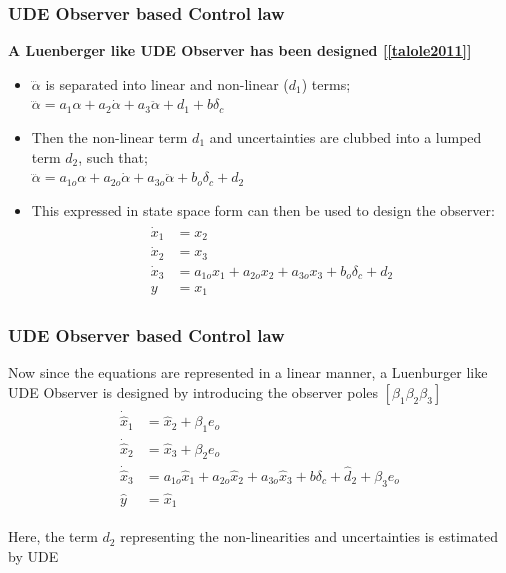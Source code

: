 \documentclass[table,10pt,red]{beamer}	%
\begin{document}
\begin{frame}
\frametitle{UDE Observer based Control law}
	\textbf{A Luenberger like UDE Observer has been designed [\ref{talole2011}] }


\begin{itemize}  %
	\item $\dddot{\alpha}$ is separated into linear and non-linear ($d_1$) terms; $\dddot{\alpha} = a_1 \alpha + a_2 \dot{\alpha} + a_3 \ddot{\alpha} + d_1 + b\delta_c$
	
	\item Then the non-linear term $d_1$ and uncertainties are clubbed into a lumped term $d_2$, such that; \\
	$\dddot{\alpha} = a_{1o} \alpha + a_{2o} \dot{\alpha} + a_{3o} \ddot{\alpha} + b_o\delta_c + d_2$\\
	
	\item This expressed in state space form can then be used to design the observer:
	\begin{eqnarray*}
		\begin{aligned}
			\dot{x}_1 &= x_2 \\
			\dot{x}_2 &= x_3 \\
			\dot{x}_3 &= a_{1o}x_1 + a_{2o}x_2 + a_{3o}x_3 + b_o \delta_c + d_2 \\
			y &= x_1 \label{rx1}
		\end{aligned}
		\label{eq5}
	\end{eqnarray*}
	
\end{itemize}

\end{frame}

\begin{frame}
\frametitle{UDE Observer based Control law}

Now since the equations are represented in a linear manner, a Luenburger like UDE Observer is designed by introducing the observer poles $[\beta_1 \beta_2 \beta_3]$
\begin{eqnarray*}
	\begin{aligned}
		\dot{\hat{x}}_1 &= \hat{x}_2 + \beta_1 e_o\\
		\dot{\hat{x}}_2 &= \hat{x}_3 + \beta_2 e_o\\
		\dot{\hat{x}}_3 &= a_{1o}\hat{x}_1 + a_{2o}\hat{x}_2 + a_{3o}\hat{x}_3 + b \delta_c + \hat{d}_2 + \beta_3 e_o\\		
		\hat{y} &= \hat{x}_1 \label{ss1}
	\end{aligned}
	\label{eq5}
\end{eqnarray*}

Here, the term $d_2$ representing the non-linearities and uncertainties is estimated by UDE

\end{frame}
\end{document}
